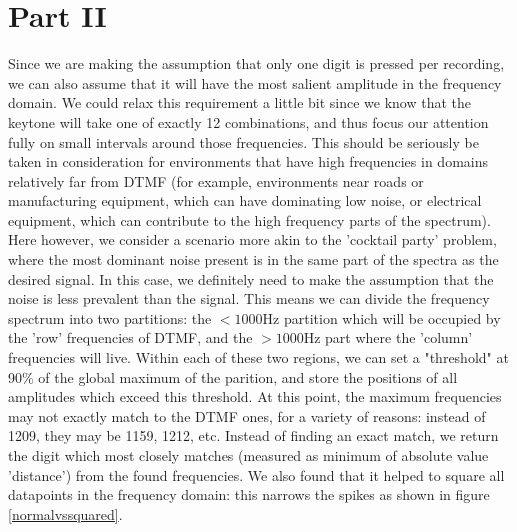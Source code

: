 \documentclass{article}
\begin{document}
\section{Part II}
Since we are making the assumption that only one digit is pressed per recording, we can also assume that it will have the most salient amplitude in the frequency domain.
We could relax this requirement a little bit since we know that the keytone will take one of exactly 12 combinations, and thus focus our attention fully on small intervals around those frequencies.
This should be seriously be taken in consideration for environments that have high frequencies in domains relatively far from DTMF (for example, environments near roads or manufacturing equipment, which can have dominating low noise, or electrical equipment, which can contribute to the high frequency parts of the spectrum).
Here however, we consider a scenario more akin to the 'cocktail party' problem, where the most dominant noise present is in the same part of the spectra as the desired signal.
In this case, we definitely need to make the assumption that the noise is less prevalent than the signal.
This means we can divide the frequency spectrum into two partitions: the $<1000$Hz partition which will be occupied by the 'row' frequencies of DTMF, and the $>1000$Hz part where the 'column' frequencies will live.
Within each of these two regions, we can set a "threshold" at 90\% of the global maximum of the parition, and store the positions of all amplitudes which exceed this threshold.
At this point, the maximum frequencies may not exactly match to the DTMF ones, for a variety of reasons: instead of 1209, they may be 1159, 1212, etc. Instead of finding an exact match, we return the digit which most closely matches (measured as minimum of absolute value 'distance') from the found frequencies.
We also found that it helped to square all datapoints in the frequency domain: this narrows the spikes as shown in figure \ref{normalvssquared}.
\end{document}
